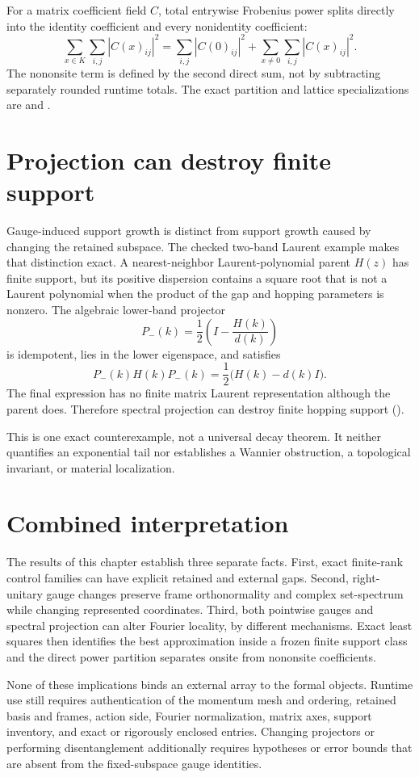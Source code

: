 For a matrix coefficient field $C$, total entrywise Frobenius power splits directly into the
identity coefficient and every nonidentity coefficient:
\[
  \sum_{x\in K}\sum_{i,j}|C(x)_{ij}|^2
  =\sum_{i,j}|C(0)_{ij}|^2
   +\sum_{x\neq0}\sum_{i,j}|C(x)_{ij}|^2.
\]
The nononsite term is defined by the second direct sum, not by subtracting separately rounded
runtime totals.  The exact partition and lattice specializations are
 and .

\section{Projection can destroy finite support}

Gauge-induced support growth is distinct from support growth caused by changing the retained
subspace.  The checked two-band Laurent example makes that distinction exact.  A nearest-neighbor
Laurent-polynomial parent $H(z)$ has finite support, but its positive dispersion contains a square
root that is not a Laurent polynomial when the product of the gap and hopping parameters is
nonzero.  The algebraic lower-band projector
\[
  P_-(k)=\frac12\left(I-\frac{H(k)}{d(k)}\right)
\]
is idempotent, lies in the lower eigenspace, and satisfies
\[
  P_-(k)H(k)P_-(k)=\frac12\bigl(H(k)-d(k)I\bigr).
\]
The final expression has no finite matrix Laurent representation although the parent does.
Therefore spectral projection can destroy finite hopping support
().

This is one exact counterexample, not a universal decay theorem.  It neither quantifies an
exponential tail nor establishes a Wannier obstruction, a topological invariant, or material
localization.

\section{Combined interpretation}

The results of this chapter establish three separate facts.  First, exact finite-rank control
families can have explicit retained and external gaps.  Second, right-unitary gauge changes
preserve frame orthonormality and complex set-spectrum while changing represented coordinates.
Third, both pointwise gauges and spectral projection can alter Fourier locality, by different
mechanisms.  Exact least squares then identifies the best approximation inside a frozen finite
support class and the direct power partition separates onsite from nononsite coefficients.

None of these implications binds an external array to the formal objects.  Runtime use still
requires authentication of the momentum mesh and ordering, retained basis and frames, action side,
Fourier normalization, matrix axes, support inventory, and exact or rigorously enclosed entries.
Changing projectors or performing disentanglement additionally requires hypotheses or error bounds
that are absent from the fixed-subspace gauge identities.

